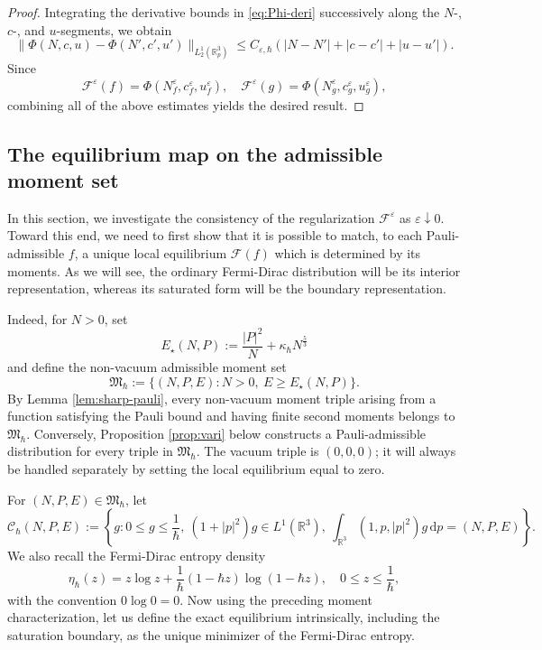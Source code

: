 \documentclass[10pt,reqno]{amsart}
\numberwithin{equation}{section}
\theoremstyle{definition}
\newcommand{\R}{\mathbb R}
\newcommand{\dpp}{\mathrm{d}p}
\newcommand{\kappah}{\kappa_{\hbar}}
\newcommand{\e}{\varepsilon}
\newcommand{\calC}{\mathcal C}
\newcommand{\calF}{\mathcal F}
\newcommand{\lt}{\left}
\newcommand{\rt}{\right}
\begin{document}
\begin{proof}
Integrating the derivative bounds in \eqref{eq:Phi-deri} successively along the $N$-, $c$-, and $u$-segments, we obtain
\[
 \|\Phi(N,c,u)-\Phi(N',c',u')\|_{L^1_2(\R^3_p)}  \leq  C_{\e,\hbar}  \lt(  |N-N'|+|c-c'|+|u-u'|  \rt).
\]
Since
\[
 \calF^\e(f)  =  \Phi(N_f^\e,c_f^\e,u_f^\e),  \quad  \calF^\e(g)  =  \Phi(N_g^\e,c_g^\e,u_g^\e),
\]
combining all of the above estimates yields the desired result.
\end{proof}

%
%
%
%
%
%

\subsection{The equilibrium map on the admissible moment set}\label{sec:ext-equil}

 In this section, we investigate the consistency of the regularization $\calF^\e$ as $\e\downarrow 0$. Toward this end, we need to first show that it is possible to match, to each Pauli-admissible $f$, a unique local equilibrium $\calF(f)$ which is determined by its moments. As we will see, the ordinary Fermi-Dirac distribution will be its interior representation, whereas its saturated form will be the boundary representation.

Indeed, for $N>0$, set
\[
 E_\star(N,P):=\frac{|P|^2}{N}+\kappah N^{\frac53}
\]
and define the non-vacuum admissible moment set
\[
 \mathfrak M_\hbar :=\{(N,P,E):N>0,\ E \ge E_\star(N,P)\}.
\] 
By Lemma \ref{lem:sharp-pauli}, every non-vacuum moment triple arising from a function satisfying the Pauli bound and having finite second moments belongs to $\mathfrak M_\hbar$.  Conversely, Proposition \ref{prop:vari} below constructs a Pauli-admissible distribution for every triple in $\mathfrak M_\hbar$.  The vacuum triple is $(0,0,0)$; it will always be handled separately by setting the local equilibrium equal to zero.

For $(N,P,E)\in\mathfrak M_\hbar$, let
\[
 \calC_\hbar(N,P,E)  :=\lt\{  g: 0\leq g\leq\frac1\hbar ,\ (1+|p|^2)g\in L^1(\R^3),\  \int_{\R^3}(1,p,|p|^2)g\,\dpp=(N,P,E)  \rt\}.
\]
We also recall the Fermi-Dirac entropy density
\[
 \eta_\hbar(z) =z\log z+\frac1\hbar(1-\hbar z)\log(1-\hbar z),  \quad 0\leq z\leq\frac1\hbar ,
\]
with the convention $0\log0=0$. Now using the preceding moment characterization, let us define the exact equilibrium intrinsically, including the saturation boundary, as the unique minimizer of the Fermi-Dirac entropy.
\end{document}
